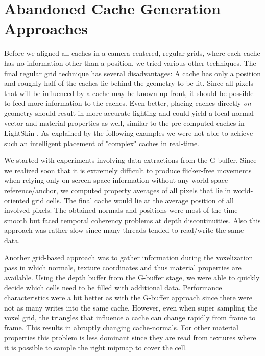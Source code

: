 \documentclass[thesis.tex]{subfiles}
\begin{document}
\section{Abandoned Cache Generation Approaches} \label{chap:abandoned}


Before we aligned all caches in a camera-centered, regular grids, where each cache has no information other than a position, we tried various other techniques. %
The final regular grid technique has several disadvantages:
A cache has only a position and roughly half of the caches lie behind the geometry to be lit.
Since all pixels that will be influenced by a cache may be known up-front, it should be possible to feed more information to the caches.
Even better, placing caches directly \emph{on} geometry should result in more accurate lighting and could yield a local normal vector and material properties as well, similar to the pre-computed caches in LightSkin \cite{bib:LightskinPaper}.
As explained by the following examples we were not able to achieve such an intelligent placement of "complex" caches in real-time.

We started with experiments involving data extractions from the G-buffer.
Since we realized soon that it is extremely difficult to produce flicker-free movements when relying only on screen-space information without any world-space reference/anchor, we computed property averages of all pixels that lie in world-oriented grid cells.
The final cache would lie at the average position of all involved pixels.
The obtained normals and positions were most of the time smooth but faced temporal coherency problems at depth discontinuities.
Also this approach was rather slow since many threads tended to read/write the same data.

Another grid-based approach was to gather information during the voxelization pass in which normals, texture coordinates and thus material properties are available.
Using the depth buffer from the G-buffer stage, we were able to quickly decide which cells need to be filled with additional data.
Performance characteristics were a bit better as with the G-buffer approach since there were not as many writes into the same cache.
However, even when super sampling the voxel grid, the triangles that influence a cache can change rapidly from frame to frame.
This results in abruptly changing cache-normals.
For other material properties this problem is less dominant since they are read from textures where it is possible to sample the right mipmap to cover the cell.
\end{document}
